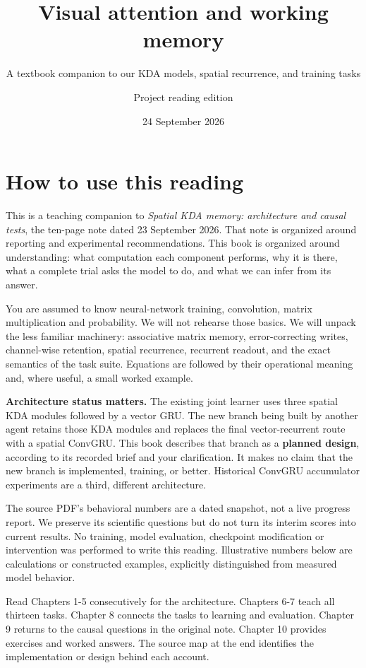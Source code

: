 \documentclass[
  11pt,
]{article}
\title{Visual attention and working memory}
\subtitle{A textbook companion to our KDA models, spatial recurrence,
and training tasks}
\author{Project reading edition}
\date{24 September 2026}
\begin{document}
\maketitle

{
\setcounter{tocdepth}{2}
\tableofcontents
}
\section{How to use this reading}\label{how-to-use-this-reading}

This is a teaching companion to \emph{Spatial KDA memory: architecture
and causal tests}, the ten-page note dated 23 September 2026. That note
is organized around reporting and experimental recommendations. This
book is organized around understanding: what computation each component
performs, why it is there, what a complete trial asks the model to do,
and what we can infer from its answer.

You are assumed to know neural-network training, convolution, matrix
multiplication and probability. We will not rehearse those basics. We
will unpack the less familiar machinery: associative matrix memory,
error-correcting writes, channel-wise retention, spatial recurrence,
recurrent readout, and the exact semantics of the task suite. Equations
are followed by their operational meaning and, where useful, a small
worked example.

\textbf{Architecture status matters.} The existing joint learner uses
three spatial KDA modules followed by a vector GRU. The new branch being
built by another agent retains those KDA modules and replaces the final
vector-recurrent route with a spatial ConvGRU. This book describes that
branch as a \textbf{planned design}, according to its recorded brief and
your clarification. It makes no claim that the new branch is
implemented, training, or better. Historical ConvGRU accumulator
experiments are a third, different architecture.

The source PDF's behavioral numbers are a dated snapshot, not a live
progress report. We preserve its scientific questions but do not turn
its interim scores into current results. No training, model evaluation,
checkpoint modification or intervention was performed to write this
reading. Illustrative numbers below are calculations or constructed
examples, explicitly distinguished from measured model behavior.

Read Chapters 1-5 consecutively for the architecture. Chapters 6-7 teach
all thirteen tasks. Chapter 8 connects the tasks to learning and
evaluation. Chapter 9 returns to the causal questions in the original
note. Chapter 10 provides exercises and worked answers. The source map
at the end identifies the implementation or design behind each account.
\end{document}
